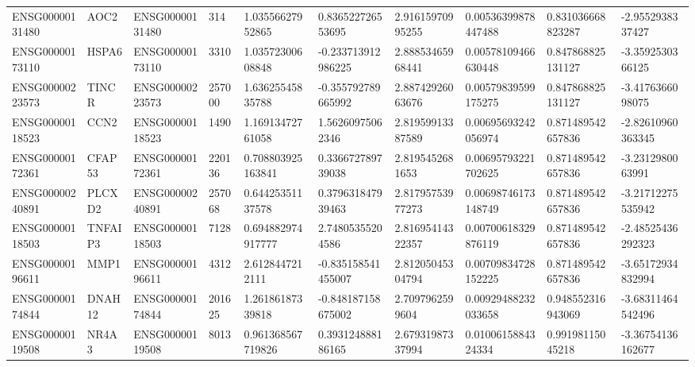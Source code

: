 \begin{tabular}{@{}llllllllll@{}}
ENSG00000131480 & AOC2 & ENSG00000131480 & 314 & 1.03556627952865 & 0.836522726553695 & 2.91615970995255 & 0.00536399878447488 & 0.831036668823287 & -2.9552938337427 \\
ENSG00000173110 & HSPA6 & ENSG00000173110 & 3310 & 1.03572300608848 & -0.233713912986225 & 2.88853465968441 & 0.00578109466630448 & 0.847868825131127 & -3.3592530366125 \\
ENSG00000223573 & TINCR & ENSG00000223573 & 257000 & 1.63625545835788 & -0.355792789665992 & 2.88742926063676 & 0.00579839599175275 & 0.847868825131127 & -3.4176366098075 \\
ENSG00000118523 & CCN2 & ENSG00000118523 & 1490 & 1.16913472761058 & 1.56260975062346 & 2.81959913387589 & 0.00695693242056974 & 0.871489542657836 & -2.82610960363345 \\
ENSG00000172361 & CFAP53 & ENSG00000172361 & 220136 & 0.708803925163841 & 0.336672789739038 & 2.8195452681653 & 0.00695793221702625 & 0.871489542657836 & -3.2312980063991 \\
ENSG00000240891 & PLCXD2 & ENSG00000240891 & 257068 & 0.64425351137578 & 0.379631847939463 & 2.81795753977273 & 0.00698746173148749 & 0.871489542657836 & -3.21712275535942 \\
ENSG00000118503 & TNFAIP3 & ENSG00000118503 & 7128 & 0.694882974917777 & 2.74805355204586 & 2.81695414322357 & 0.00700618329876119 & 0.871489542657836 & -2.48525436292323 \\
ENSG00000196611 & MMP1 & ENSG00000196611 & 4312 & 2.6128447212111 & -0.835158541455007 & 2.81205045304794 & 0.00709834728152225 & 0.871489542657836 & -3.65172934832994 \\
ENSG00000174844 & DNAH12 & ENSG00000174844 & 201625 & 1.26186187339818 & -0.848187158675002 & 2.7097962599604 & 0.00929488232033658 & 0.948552316943069 & -3.68311464542496 \\
ENSG00000119508 & NR4A3 & ENSG00000119508 & 8013 & 0.961368567719826 & 0.393124888186165 & 2.67931987337994 & 0.0100615884324334 & 0.99198115045218 & -3.36754136162677 \\
\bottomrule
\end{tabular}
\endgroup
